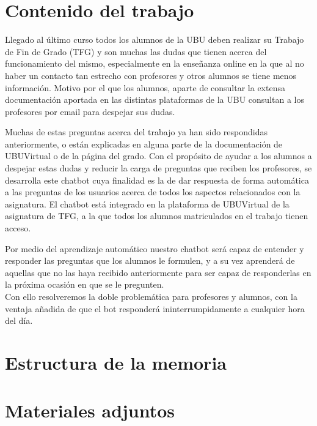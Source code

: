 
\section{Contenido del trabajo}

Llegado al último curso todos los alumnos de la UBU deben realizar su Trabajo de Fin de Grado (TFG) y son muchas las dudas que tienen acerca del funcionamiento del mismo, especialmente en la enseñanza online en la que al no haber un contacto tan estrecho con profesores y otros alumnos se tiene menos información. Motivo por el que los alumnos, aparte de consultar la extensa documentación aportada en las distintas plataformas de la UBU consultan a los profesores por email para despejar sus dudas.

Muchas de estas preguntas acerca del trabajo ya han sido respondidas anteriormente, o están explicadas en alguna parte de la documentación de UBUVirtual o de la página del grado. Con el propósito de ayudar a los alumnos a despejar estas dudas y reducir la carga de preguntas que reciben los profesores, se desarrolla este chatbot cuya finalidad es la de dar respuesta de forma automática a las preguntas de los usuarios acerca de todos los aspectos relacionados con la asignatura. El chatbot está integrado en la plataforma de UBUVirtual de la asignatura de TFG, a la que todos los alumnos matriculados en el trabajo tienen acceso. 

Por medio del aprendizaje automático nuestro chatbot será capaz de entender y responder las preguntas que los alumnos le formulen, y a su vez aprenderá de aquellas que no las haya recibido anteriormente para ser capaz de responderlas en la próxima ocasión en que se le pregunten.\\
Con ello resolveremos la doble problemática para profesores y alumnos, con la ventaja añadida de que el bot responderá ininterrumpidamente a cualquier hora del día.



\section{Estructura de la memoria}


\section{Materiales adjuntos}

